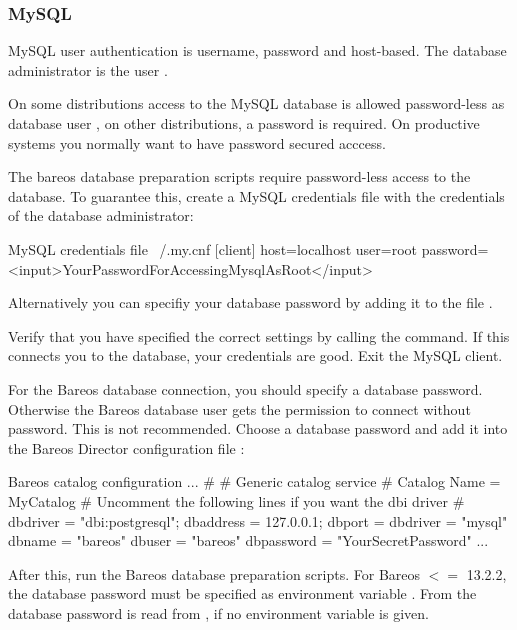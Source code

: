\subsubsection{MySQL}
    \label{catalog-maintenance-mysql}

MySQL user authentication is username, password and host-based.
The database administrator is the user .

On some distributions access to the MySQL database is allowed password-less as database user ,
on other distributions, a password is required.
On productive systems you normally want to have password secured acccess.

The bareos database preparation scripts require password-less access to the database.
To guarantee this, create a MySQL credentials file  with the credentials of the database administrator:
\begin{config}{MySQL credentials file ~/.my.cnf}
[client]
host=localhost
user=root
password=<input>YourPasswordForAccessingMysqlAsRoot</input>
\end{config}
Alternatively you can specifiy your database password by adding it to the file .

Verify that you have specified the correct settings by calling the  command.
If this connects you to the database, your credentials are good.
Exit the MySQL client.

For the Bareos database connection, you should specify a database password. 
Otherwise the Bareos database user gets the permission to connect without password.
This is not recommended.
Choose a database password and add it into the Bareos Director configuration file \configFileDirUnix:
\begin{bconfig}{Bareos catalog configuration}
...
#
# Generic catalog service
#
Catalog {
  Name = MyCatalog
  # Uncomment the following lines if you want the dbi driver
  # dbdriver = "dbi:postgresql"; dbaddress = 127.0.0.1; dbport =  
  dbdriver = "mysql"
  dbname = "bareos"
  dbuser = "bareos"
  dbpassword = "YourSecretPassword"
}
...
\end{bconfig}

After this, run the Bareos database preparation scripts.
For Bareos $<=$ 13.2.2, the database password must be specified as environment variable .
From  
the database password is read from \configFileDirUnix, if no environment variable is given.

